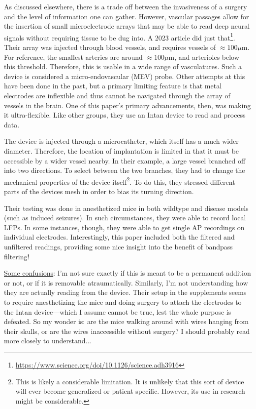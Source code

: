 As discussed elsewhere, there is a trade off between the invasiveness of a surgery and the level of information one can gather. However, vascular passages allow for the insertion of small microelectrode arrays that may be able to read deep neural signals without requiring tissue to be dug into. A 2023 article did just that\footnote{\url{https://www.science.org/doi/10.1126/science.adh3916}}. Their array was injected through blood vessels, and requires vessels of $\approx 100 \mu$m. For reference, the smallest arteries are around $\approx 100 \mu$m, and arterioles below this threshold. Therefore, this is usable in a wide range of vasculatures. Such a device is considered a micro-endovascular (MEV) probe. Other attempts at this have been done in the past, but a primary limiting feature is that metal electrodes are inflexible and thus cannot be navigated through the array of vessels in the brain. One of this paper's primary advancements, then, was making it ultra-flexible. Like other groups, they use an Intan device to read and process data.\newline

The device is injected through a microcatheter, which itself has a much wider diameter. Therefore, the location of implantation is limited in that it must be accessible by a wider vessel nearby. In their example, a large vessel branched off into two directions. To select between the two branches, they had to change the mechanical properties of the device itself\footnote{This is likely a considerable limitation. It is unlikely that this sort of device will ever become generalized or patient specific. However, its use in research might be considerable.}. To do this, they stressed different parts of the devices mesh in order to bias its turning direction.\newline

Their testing was done in anesthetized mice in both wildtype and disease models (such as induced seizures). In such circumstances, they were able to record local LFPs. In some instances, though, they were able to get single AP recordings on individual electrodes. Interestingly, this paper included both the filtered and unfiltered readings, providing some nice insight into the benefit of bandpass filtering!\newline

\underline{Some confusions}: I'm not sure exactly if this is meant to be a permanent addition or not, or if it is removable atraumatically. Similarly, I'm not understanding how they are actually reading from the device. Their setup in the supplements seems to require anesthetizing the mice and doing surgery to attach the electrodes to the Intan device---which I assume cannot be true, lest the whole purpose is defeated. So my wonder is: are the mice walking around with wires hanging from their skulls, or are the wires inaccessible without surgery? I should probably read more closely to understand...\newline


